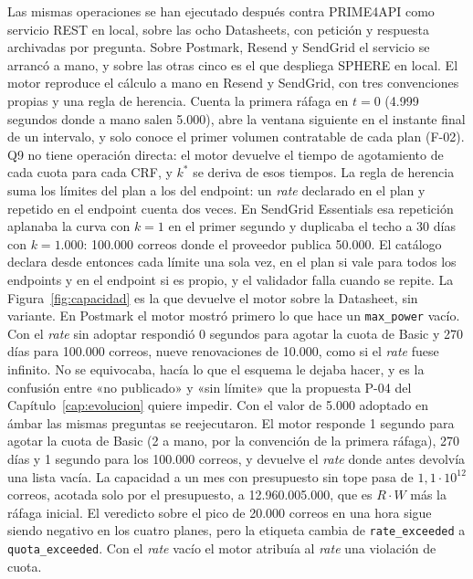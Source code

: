Las mismas operaciones se han ejecutado después contra PRIME4API como servicio REST en local, sobre las ocho Datasheets, con petición y respuesta archivadas por pregunta.
Sobre Postmark, Resend y SendGrid el servicio se arrancó a mano, y sobre las otras cinco es el que despliega SPHERE en local.
El motor reproduce el cálculo a mano en Resend y SendGrid, con tres convenciones propias y una regla de herencia.
Cuenta la primera ráfaga en $t = 0$ (4.999 segundos donde a mano salen 5.000), abre la ventana siguiente en el instante final de un intervalo, y solo conoce el primer volumen contratable de cada plan (F-02).
Q9 no tiene operación directa: el motor devuelve el tiempo de agotamiento de cada cuota para cada CRF, y $k^{*}$ se deriva de esos tiempos.
La regla de herencia suma los límites del plan a los del endpoint: un \textit{rate} declarado en el plan y repetido en el endpoint cuenta dos veces.
En SendGrid Essentials esa repetición aplanaba la curva con $k = 1$ en el primer segundo y duplicaba el techo a 30 días con $k = 1.000$: 100.000 correos donde el proveedor publica 50.000.
El catálogo declara desde entonces cada límite una sola vez, en el plan si vale para todos los endpoints y en el endpoint si es propio, y el validador falla cuando se repite.
La Figura~\ref{fig:capacidad} es la que devuelve el motor sobre la Datasheet, sin variante.
En Postmark el motor mostró primero lo que hace un \texttt{max\_power} vacío.
Con el \textit{rate} sin adoptar respondió 0 segundos para agotar la cuota de Basic y 270 días para 100.000 correos, nueve renovaciones de 10.000, como si el \textit{rate} fuese infinito.
No se equivocaba, hacía lo que el esquema le dejaba hacer, y es la confusión entre «no publicado» y «sin límite» que la propuesta P-04 del Capítulo~\ref{cap:evolucion} quiere impedir.
Con el valor de 5.000 adoptado en ámbar las mismas preguntas se reejecutaron.
El motor responde 1 segundo para agotar la cuota de Basic (2 a mano, por la convención de la primera ráfaga), 270 días y 1 segundo para los 100.000 correos, y devuelve el \textit{rate} donde antes devolvía una lista vacía.
La capacidad a un mes con presupuesto sin tope pasa de $1{,}1 \cdot 10^{12}$ correos, acotada solo por el presupuesto, a 12.960.005.000, que es $R \cdot W$ más la ráfaga inicial.
El veredicto sobre el pico de 20.000 correos en una hora sigue siendo negativo en los cuatro planes, pero la etiqueta cambia de \texttt{rate\_exceeded} a \texttt{quota\_exceeded}.
Con el \textit{rate} vacío el motor atribuía al \textit{rate} una violación de cuota.

